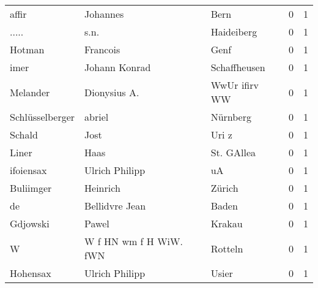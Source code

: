 \begin{tabular}{llllrr}
                    affir &                           Johannes &             &                                        Bern &          0 &         1 \\
                    ..... &                               s.n. &             &                                  Haideiberg &          0 &         1 \\
                   Hotman &                           Francois &             &                                        Genf &          0 &         1 \\
                     imer &                      Johann Konrad &             &                                Schaffheusen &          0 &         1 \\
                 Melander &                       Dionysius A. &             &                               WwUr ifirv WW &          0 &         1 \\
          Schlüsselberger &                             abriel &             &                                    Nürnberg &          0 &         1 \\
                   Schald &                               Jost &             &                                       Uri z &          0 &         1 \\
                    Liner &                               Haas &             &                                  St. GAllea &          0 &         1 \\
                ifoiensax &                     Ulrich Philipp &             &                                          uA &          0 &         1 \\
                Buliimger &                           Heinrich &             &                                      Zürich &          0 &         1 \\
                       de &                     Bellidvre Jean &             &                                       Baden &          0 &         1 \\
                 Gdjowski &                              Pawel &             &                                      Krakau &          0 &         1 \\
                        W &             W f HN wm f H WiW. fWN &             &                                     Rotteln &          0 &         1 \\
                 Hohensax &                     Ulrich Philipp &             &                                       Usier &          0 &         1 \\

\end{tabular}
